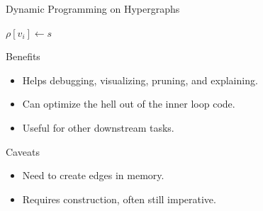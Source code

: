 \documentclass{beamer}
\def\im#1#2{
  \node(#1) [scale=#2]{\pgfbox[center,top]{\pgfuseimage{#1}}
};}
\newcommand{\air}{\vspace{0.5cm}}
\begin{document}
\begin{frame}{Dynamic Programming on Hypergraphs}
  \begin{algorithmic}
    \EndFor{}
    \EndProcedure{}
  \end{algorithmic}
\end{frame}


\begin{frame}[t]
  \vspace{-1cm}
  \begin{figure}
    \centering
  \end{figure}
\end{frame}

\begin{frame}
\begin{algorithmic}
 $\rho[v_i] \gets s$
\EndIf{}
\EndFor{}
\State{\Return{$\rho$}}
\EndProcedure{}
\end{algorithmic}
\end{frame}

\begin{frame}{Benefits}
  \begin{itemize}
  \item Helps debugging, visualizing, pruning, and explaining.
    \air 
  \item Can optimize the hell out of the inner loop code.
    \air 
  \item Useful for other downstream tasks.
  \end{itemize}
\end{frame}

\begin{frame}{Caveats}
  \begin{itemize}
  \item Need to create edges in memory.
    \air 
  \item Requires construction, often still imperative. 
  \end{itemize}
\end{frame}
\end{document}
